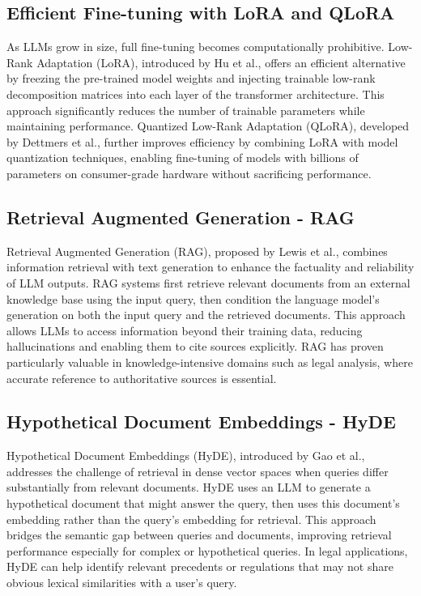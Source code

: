 \subsection{Efficient Fine-tuning with LoRA and QLoRA}
As LLMs grow in size, full fine-tuning becomes computationally prohibitive. 
Low-Rank Adaptation (LoRA), introduced by Hu et al.\cite{hu2021}, offers 
an efficient alternative by freezing the pre-trained model weights and 
injecting trainable low-rank decomposition matrices into each layer of 
the transformer architecture. This approach significantly reduces the 
number of trainable parameters while maintaining performance. Quantized 
Low-Rank Adaptation (QLoRA), developed by Dettmers et al.\cite{dettmers2023}, 
further improves efficiency by combining LoRA with model quantization techniques, 
enabling fine-tuning of models with billions of parameters on consumer-grade 
hardware without sacrificing performance.
\subsection{Retrieval Augmented Generation - RAG}
Retrieval Augmented Generation (RAG), proposed by Lewis et 
al.\cite{lewis2020retrieval}, combines information retrieval with text 
generation to enhance the factuality and reliability of LLM outputs. 
RAG systems first retrieve relevant documents from an external knowledge 
base using the input query, then condition the language model's generation 
on both the input query and the retrieved documents. This approach allows 
LLMs to access information beyond their training data, reducing 
hallucinations and enabling them to cite sources explicitly. 
RAG has proven particularly valuable in knowledge-intensive domains 
such as legal analysis, where accurate reference to authoritative 
sources is essential.
\subsection{Hypothetical Document Embeddings - HyDE}
Hypothetical Document Embeddings (HyDE), introduced by Gao et al.\cite{gao2022}, 
addresses the challenge of retrieval in dense vector spaces when queries 
differ substantially from relevant documents. HyDE uses an LLM to generate a 
hypothetical document that might answer the query, then uses this document's embedding rather 
than the query's embedding for retrieval. This approach bridges the semantic gap between queries 
and documents, improving retrieval performance especially for complex or hypothetical queries. In legal 
applications, HyDE can help identify relevant precedents or regulations that may not share obvious lexical 
similarities with a user's query\cite{gao2022}.
